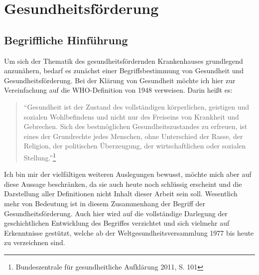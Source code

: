 \section{Gesundheitsförderung}
\label{sec:Gesundheitsförderung}

\subsection{Begriffliche Hinführung}
\label{sec:BegrifflicheHinführung}

Um sich der Thematik des gesundheitsfördernden Krankenhauses grundlegend anzunähern, bedarf es zunächst einer Begriffsbestimmung von Gesundheit und Gesundheitsförderung. Bei der Klärung von Gesundheit möchte ich hier zur Vereinfachung auf die WHO-Definition von 1948 verweisen. Darin heißt es: 

\begin{quotation}
"`Gesundheit ist der Zustand des vollständigen körperlichen, geistigen und sozialen Wohlbefindens und nicht nur des Freiseins von Krankheit und Gebrechen. Sich des bestmöglichen Gesundheitszustandes zu erfreuen, ist eines der Grundrechte jedes Menschen, ohne Unterschied der Rasse, der Religion, der politischen Überzeugung, der wirtschaftlichen oder sozialen Stellung."'\footnote{Bundeszentrale für gesundheitliche Aufklärung 2011, S. 101}
\end{quotation}

Ich bin mir der vielfältigen weiteren Auslegungen bewusst, möchte mich aber auf diese Aussage beschränken, da sie auch heute noch schlüssig erscheint und die Darstellung aller Definitionen nicht Inhalt dieser Arbeit sein soll. Wesentlich mehr von Bedeutung ist in diesem Zusammenhang der Begriff der Gesundheitsförderung. Auch hier wird auf die vollständige Darlegung der geschichtlichen Entwicklung des Begriffes verzichtet und sich vielmehr auf Erkenntnisse gestützt, welche ab der Weltgesundheitsversammlung 1977 bis heute zu verzeichnen sind.


